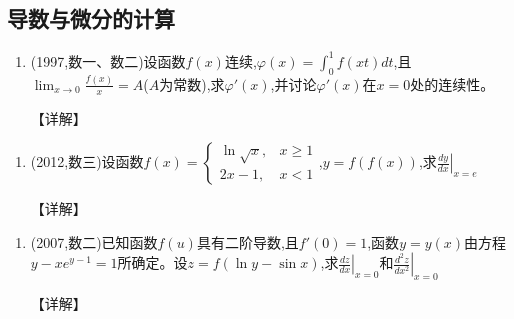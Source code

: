\documentclass[12pt, a4paper, oneside, UTF8]{ctexbook}
\begin{document}
\subsection{导数与微分的计算}

\begin{remark}
\end{remark}

\begin{enumerate}[label=\arabic*.,start=4]
    \item (1997,数一、数二)设函数$f(x)$连续,$\varphi(x)=\int_0^1 f(xt)dt$,且$\lim_{x\to0}\frac{f(x)}{x}=A$($A$为常数),求$\varphi'(x)$,并讨论$\varphi'(x)$在$x=0$处的连续性。
    
    \begin{solution}
    【详解】
    \end{solution}
\end{enumerate}

\begin{remark}
\end{remark}

\begin{enumerate}[label=\arabic*.,start=5]
    \item (2012,数三)设函数$f(x)=\begin{cases}
        \ln\sqrt{x}, & x\geq1 \\
        2x-1, & x<1
    \end{cases}$,$y=f(f(x))$,求$\left.\frac{dy}{dx}\right|_{x=e}$
    
    \begin{solution}
    【详解】
    \end{solution}
\end{enumerate}

\begin{remark}
\end{remark}

\begin{enumerate}[label=\arabic*.,start=6]
    \item (2007,数二)已知函数$f(u)$具有二阶导数,且$f'(0)=1$,函数$y=y(x)$由方程$y-xe^{y-1}=1$所确定。设$z=f(\ln y-\sin x)$,求$\left.\frac{dz}{dx}\right|_{x=0}$和$\left.\frac{d^2z}{dx^2}\right|_{x=0}$
    
    \begin{solution}
    【详解】
    \end{solution}
\end{enumerate}

\begin{remark}
\end{remark}
\end{document}
